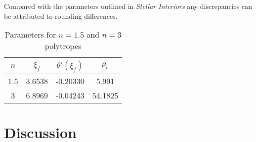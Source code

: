 \documentclass[twoside]{article}
\begin{document}
\begin{multicols}{2}
Compared with the parameters outlined in \textit{Stellar
Interiors}\cite{hansen2004} any discrepancies can be attributed to rounding
differences.

\begin{table}[H]
\caption{Parameters for \(n=1.5\) and \(n=3\) polytropes\cite{hansen2004}}
\centering
\begin{tabular}{c | c c c}
\toprule
\(n\) & \(\xi_f\) & \(\theta'(\xi_f)\) & \(\rho_c\) \\
\midrule
1.5 & 3.6538 & -0.20330 & 5.991 \\
3 & 6.8969 & -0.04243 & 54.1825 \\
\bottomrule
\end{tabular}
\end{table}


\section{Discussion}

\end{multicols}



\end{document}
